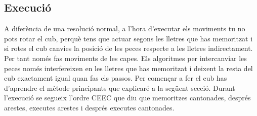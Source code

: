 \subsection{Execució}

A diferència de una resolució normal, a l'hora d'executar els moviments tu no pots rotar el cub, perquè tens que actuar segons les lletres que has memoritzat i si rotes el cub canvies la posició de les peces respecte a les lletres indirectament.
Per tant només fas moviments de les capes. Els algoritmes per intercanviar les peces només interfereixen en les lletres que has memoritzat i deixent la resta del cub exactament igual quan fas els passos. Per començar a fer el cub has d'aprendre el mètode principants que explicaré a la següent secció.
Durant l'execució se segueix l'ordre CEEC que diu que memoritzes cantonades, després arestes, executes arestes i després executes cantonades.
